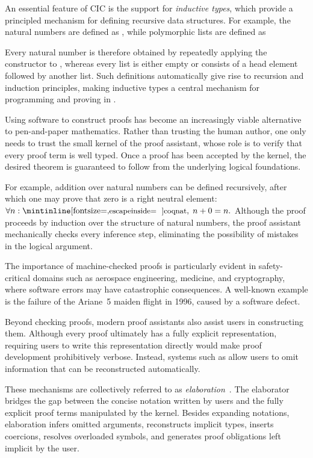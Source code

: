 An essential feature of CIC is the support for \emph{inductive types},
which provide a principled mechanism for defining recursive data structures.
For example, the natural numbers are defined as
,
while polymorphic lists are defined as

Every natural number is therefore obtained by repeatedly applying the
constructor  to , whereas every list is either empty or consists of
a head element followed by another list. Such definitions automatically give
rise to recursion and induction principles, making inductive types a central
mechanism for programming and proving in \rocq.

Using software to construct proofs has become an increasingly viable
alternative to pen-and-paper mathematics. Rather than trusting the human
author, one only needs to trust the small kernel of the proof assistant,
whose role is to verify that every proof term is well typed. Once a proof has
been accepted by the kernel, the desired theorem is guaranteed to follow from
the underlying logical foundations.

For example, addition over natural numbers can be defined recursively, after
which one may prove that zero is a right neutral element:
$ \forall n : \cI{nat},\; n + 0 = n. $
Although the proof proceeds by induction over the structure of natural
numbers, the proof assistant mechanically checks every inference step,
eliminating the possibility of mistakes in the logical argument.

The importance of machine-checked proofs is particularly evident in
safety-critical domains such as aerospace engineering, medicine, and
cryptography, where software errors may have catastrophic consequences. A
well-known example is the failure of the Ariane~5 maiden flight in 1996,
caused by a software defect.

Beyond checking proofs, modern proof assistants also assist users in
constructing them. Although every proof ultimately has a fully explicit
representation, requiring users to write this representation directly would
make proof development prohibitively verbose. Instead, systems such as
\rocq allow users to omit information that can be reconstructed
automatically.

These mechanisms are collectively referred to as
\emph{elaboration}~\cite[Chap.~6]{elaboration}. The elaborator bridges the gap
between the concise notation written by users and the fully explicit proof
terms manipulated by the kernel. Besides expanding notations, elaboration
infers omitted arguments, reconstructs implicit types, inserts coercions,
resolves overloaded symbols, and generates proof obligations left implicit by
the user.


